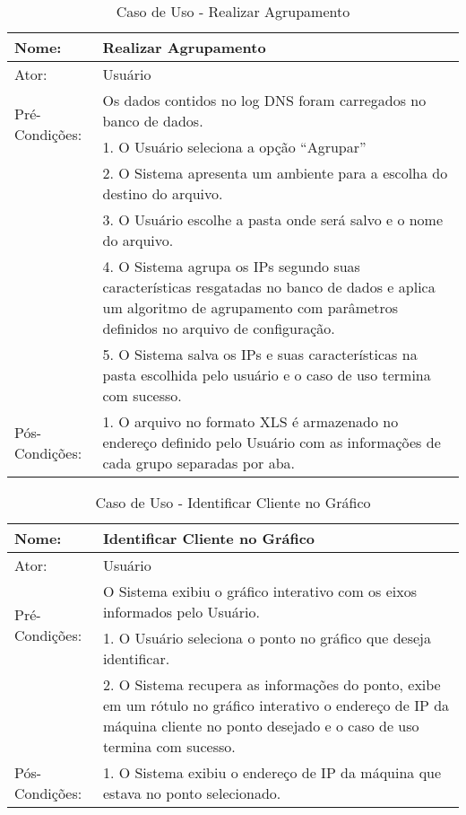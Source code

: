 \begin{table}[]
\centering
\caption{Caso de Uso - Realizar Agrupamento}
\label{tab:use_case_clustering}
\begin{tabular}{|lp{10cm}|}
\hline
Nome: & Realizar Agrupamento  \\ \hline
Ator: & Usuário   \\ \hline
\multirow{2}{*}{Pré-Condições:} & Os dados contidos no log DNS foram carregados no banco de dados.  \\ \hline
\multirow{12}{*}{Fluxo Básico de Eventos:} & 1. O Usuário seleciona a opção ``Agrupar''  \\
 & 2. O Sistema apresenta um ambiente para a escolha do destino do arquivo. \\
 & 3. O Usuário escolhe a pasta onde será salvo e o nome do arquivo. \\
 & 4. O Sistema agrupa os IPs segundo suas características resgatadas no banco de dados e aplica um algoritmo de agrupamento com parâmetros definidos no arquivo de configuração.  \\
 & 5. O Sistema salva os IPs e suas características na pasta escolhida pelo usuário e o caso de uso termina com sucesso. \\
 \hline
\multirow{3}{*}{Pós-Condições:} & 1. O arquivo no formato XLS é armazenado no endereço definido pelo Usuário com as informações de cada grupo separadas por aba. \\
\hline
\end{tabular}
\end{table}

\begin{table}[]
\centering
\caption{Caso de Uso - Identificar Cliente no Gráfico}
\label{tab:use_case_identify}
\begin{tabular}{|lp{10cm}|}
\hline
Nome: & Identificar Cliente no Gráfico  \\ \hline
Ator: & Usuário   \\ \hline
\multirow{2}{*}{Pré-Condições:} & O Sistema exibiu o gráfico interativo com os eixos informados pelo Usuário.  \\ \hline
\multirow{6}{*}{Fluxo Básico de Eventos:} & 1. O Usuário seleciona o ponto no gráfico que deseja identificar.  \\
 & 2. O Sistema recupera as informações do ponto, exibe em um rótulo no gráfico interativo o endereço de IP da máquina cliente no ponto desejado e o caso de uso termina com sucesso. \\
 \hline
 \multirow{2}{*}{Pós-Condições:} & 1. O Sistema exibiu o endereço de IP da máquina que estava no ponto selecionado. \\
 \hline
\end{tabular}
\end{table}

